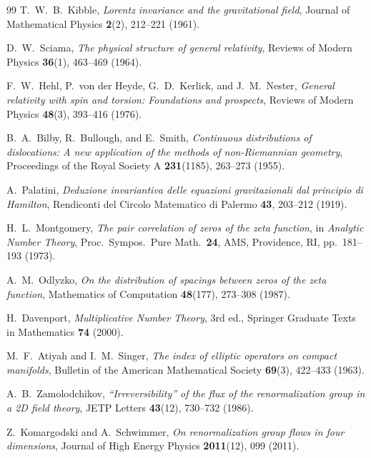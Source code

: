 \documentclass[11pt,a4paper]{article}
\theoremstyle{plain}
\theoremstyle{definition}
\theoremstyle{remark}
\begin{document}
\begin{thebibliography}{99}
T.~W.~B.~Kibble,
\textit{Lorentz invariance and the gravitational field},
Journal of Mathematical Physics \textbf{2}(2), 212--221 (1961).

D.~W.~Sciama,
\textit{The physical structure of general relativity},
Reviews of Modern Physics \textbf{36}(1), 463--469 (1964).

F.~W.~Hehl, P.~von der Heyde, G.~D.~Kerlick, and J.~M.~Nester,
\textit{General relativity with spin and torsion: Foundations and prospects},
Reviews of Modern Physics \textbf{48}(3), 393--416 (1976).

B.~A.~Bilby, R.~Bullough, and E.~Smith,
\textit{Continuous distributions of dislocations: A new application of the methods of non-Riemannian geometry},
Proceedings of the Royal Society A \textbf{231}(1185), 263--273 (1955).

A.~Palatini,
\textit{Deduzione invariantiva delle equazioni gravitazionali dal principio di Hamilton},
Rendiconti del Circolo Matematico di Palermo \textbf{43}, 203--212 (1919).

H.~L.~Montgomery,
\textit{The pair correlation of zeros of the zeta function},
in \textit{Analytic Number Theory}, Proc.\ Sympos.\ Pure Math.\ \textbf{24},
AMS, Providence, RI, pp.~181--193 (1973).

A.~M.~Odlyzko,
\textit{On the distribution of spacings between zeros of the zeta function},
Mathematics of Computation \textbf{48}(177), 273--308 (1987).

H.~Davenport,
\textit{Multiplicative Number Theory},
3rd ed., Springer Graduate Texts in Mathematics \textbf{74} (2000).

M.~F.~Atiyah and I.~M.~Singer,
\textit{The index of elliptic operators on compact manifolds},
Bulletin of the American Mathematical Society \textbf{69}(3), 422--433 (1963).

A.~B.~Zamolodchikov,
\textit{``Irreversibility'' of the flux of the renormalization group in a 2D field theory},
JETP Letters \textbf{43}(12), 730--732 (1986).

Z.~Komargodski and A.~Schwimmer,
\textit{On renormalization group flows in four dimensions},
Journal of High Energy Physics \textbf{2011}(12), 099 (2011).


\end{thebibliography}
\end{document}
